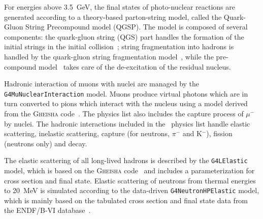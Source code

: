 \documentclass[article]{IEEEtran}
\begin{document}
For energies above 3.5~GeV, the final states of photo-nuclear reactions are generated 
according to a theory-based parton-string model, called the Quark-Gluon String Precompound 
model (QGSP). The model is composed of several components: the quark-gluon string 
(QGS) part handles the formation of the initial strings in the initial collision~\cite{qgsp1}; 
string fragmentation into hadrons is handled by the quark-gluon string fragmentation 
model~\cite{qgsp2}, while the pre-compound model~\cite{qgsp3} takes care of 
the de-excitation of the residual nucleus. 

 
Hadronic interaction of muons with nuclei are managed by the \texttt{G4MuNuclearInteraction} 
model. Muons produce virtual photons which are in turn converted to pions which interact with 
the nucleus using a model derived from 
the \textsc{Gheisha} code~\cite{gheisha}. The physics list also includes 
the capture process of $\mu^{-}$ by nuclei. The hadronic interactions included in the \MaGe\ physics list handle elastic scattering, 
inelastic scattering, capture (for neutrons, $\pi^{-}$ and K$^{-}$), fission (neutrons only) and 
decay.


The elastic scattering of all long-lived hadrons is described by the \texttt{G4LElastic} model, 
which is based on the \textsc{Gheisha} code~\cite{gheisha} and includes a 
parameterization for cross section and final state. 
Elastic scattering of neutrons from thermal energies to 20~MeV is simulated 
according to the data-driven \texttt{G4NeutronHPElastic} model, which is mainly based on the tabulated 
cross section and final state data from the ENDF/B-VI database~\cite{endf1, endf2}.
\end{document}
